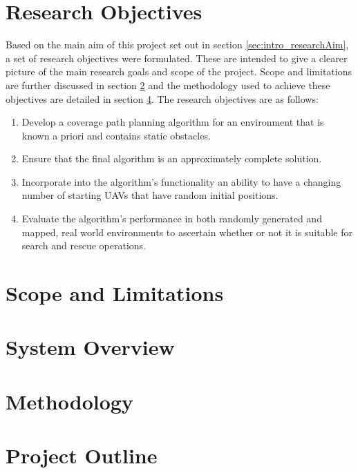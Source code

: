 \section{Research Objectives}
\label{sec:intro_Objectives}
Based on the main aim of this project set out in section \ref{sec:intro_researchAim}, a set of research objectives were formulated. These are intended to give a clearer picture of the main research goals and scope of the project. Scope and limitations are further discussed in section \ref{sec:intro_scope} and the methodology used to achieve these objectives are detailed in section \ref{sec:intro_method}. The research objectives are as follows:
\begin{enumerate}
	\item Develop a coverage path planning algorithm for an environment that is known a priori and contains static obstacles.
	\item Ensure that the final algorithm is an approximately complete solution.
	\item Incorporate into the algorithm's functionality an ability to have a changing number of starting UAVs that have random initial positions.
	\item Evaluate the algorithm's performance in both randomly generated and mapped, real world environments to ascertain whether or not it is suitable for search and rescue operations.
\end{enumerate}

\section{Scope and Limitations}
\label{sec:intro_scope}

\section{System Overview}

\section{Methodology}
\label{sec:intro_method}

\section{Project Outline}
\label{sec:intro_struct}
